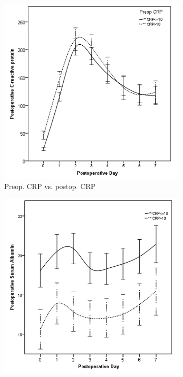 


\clearpage

\begin{figure}[p]
	\caption{Relationship between preoperative CRP levels and postoperative inflammatory markers in the first week after pancreaticoduodenectomy.}
	\label{fig:sirs_crp}
	\centering
	\begin{subfigure}{0.48\textwidth}
		\centering
		\includegraphics[width=\textwidth]{Figures/sirs_crp_crp}
		\caption{Preop. CRP vs. postop. CRP}
		\label{fig:sirs_crp_crp}
	\end{subfigure}
	\hfill
	\begin{subfigure}{0.48\textwidth}
		\centering
		\includegraphics[width=\textwidth]{Figures/sirs_crp_alb}

\end{subfigure}
\end{figure}
